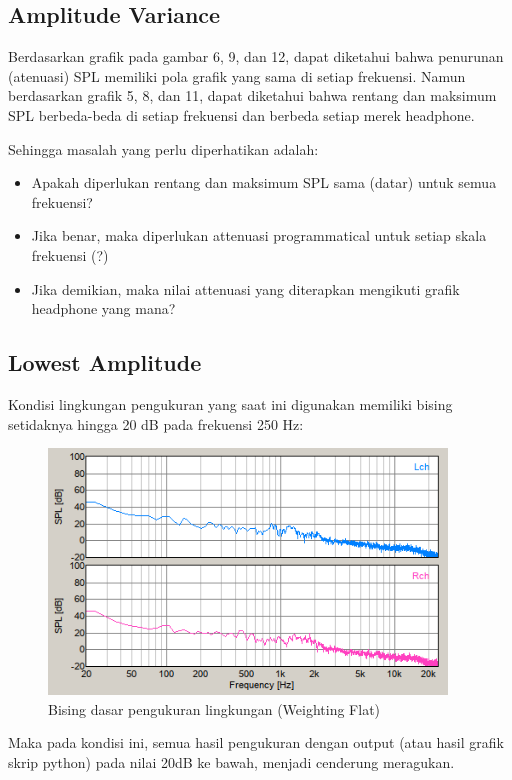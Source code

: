 \documentclass[12pt,]{article}
\begin{document}
	\subsection{Amplitude Variance}
	
	Berdasarkan grafik pada gambar 6, 9, dan 12, dapat diketahui bahwa penurunan (atenuasi) SPL memiliki pola grafik yang sama di setiap frekuensi.
	Namun berdasarkan grafik 5, 8, dan 11, dapat diketahui bahwa rentang dan maksimum SPL berbeda-beda di setiap frekuensi dan berbeda setiap merek headphone.
	
	Sehingga masalah yang perlu diperhatikan adalah:
	\begin{itemize}
		\item Apakah diperlukan rentang dan maksimum SPL sama (datar) untuk semua frekuensi?
		\item Jika benar, maka diperlukan attenuasi programmatical untuk setiap skala frekuensi (?)
		\item Jika demikian, maka nilai attenuasi yang diterapkan mengikuti grafik headphone yang mana?
	\end{itemize}
	
	\newpage
	\subsection{Lowest Amplitude}
	
	Kondisi lingkungan pengukuran yang saat ini digunakan memiliki bising setidaknya hingga 20 dB pada frekuensi 250 Hz:
	
	\begin{figure}[!ht]
		\centering
		\includegraphics[width=300pt]{hasil/ground}
		\caption{Bising dasar pengukuran lingkungan (Weighting Flat)}
	\end{figure}

	Maka pada kondisi ini, semua hasil pengukuran dengan output (atau hasil grafik skrip python) pada nilai 20dB ke bawah, 
	menjadi cenderung meragukan.
	
\end{document}
